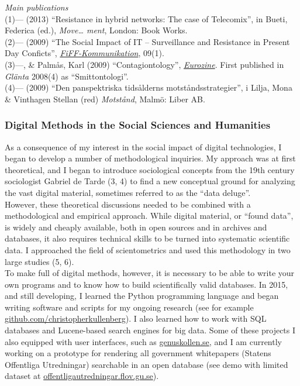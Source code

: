 \documentclass[a4paper,11pt,oneside]{article}
\begin{document}
      \noindent  \emph{Main publications} \\
      (1)--- (2013) ``Resistance in hybrid networks: The case of Telecomix'', in Bueti, Federica (ed.), \emph{Move… ment}, London: Book Works.\\
      (2)--- (2009) ``The Social Impact of IT – Surveillance and Resistance in Present Day Conficts'', \href{http://www.fiff.de/publikationen/fiff-kommunikation/fk-2009/fiff-ko-1-2009/fiko_1_2009_kullenberg.pdf}{\emph{FiFF-Kommunikation}}, 09(1).\\
      (3)---, \& Palmås, Karl (2009) ``Contagiontology'', \href{http://www.eurozine.com/articles/2009-03-09-kullenberg-en.html}{\emph{Eurozine}}. First published in \emph{Glänta} 2008(4) as ``Smittontologi''.\\
      (4)--- (2009) ``Den panspektriska tidsålderns motståndsstrategier'', i Lilja, Mona \& Vinthagen Stellan (red) \emph{Motstånd}, Malmö: Liber AB.\\


    \subsubsection{Digital Methods in the Social Sciences and Humanities}
    As a consequence of my interest in the social impact of digital technologies,
    I began to develop a number of methodological inquiries. My approach was
    at first theoretical, and I began to introduce sociological concepts from the
    19th century sociologist Gabriel de Tarde (3, 4) to find a new conceptual
    ground for analyzing the vast digital material, sometimes referred to as the
    ``data deluge''.\\

    However, these theoretical discussions needed to be combined with a methodological and
    empirical approach. While digital material, or ``found data'', is widely and cheaply
    available, both in open sources and in archives and databases, it also requires
    technical skills to be turned into systematic scientific data. I approached the
    field of scientometrics and used this methodology in two large studies (5, 6).\\

    To make full of digital methods, however, it is necessary to be able to write
    your own programs and to know how to build scientifically valid databases. In
    2015, and still developing, I learned the Python programming language and began
    writing software and scripts for my ongoing research (see for example
    \href{https://github.com/christopherkullenberg}{github.com/christopherkullenberg}).
    I also learned how to work with SQL databases and Lucene-based search engines for big data.
    Some of these projects I also equipped with user interfaces, such as
    \href{https://genuskollen.se/}{genuskollen.se}, and I am currently working
    on a prototype for rendering all government whitepapers (Statens Offentliga Utredningar)
    searchable in an open database (see demo with limited dataset at
     \href{http://offentligautredningar.flov.gu.se/}{offentligautredningar.flov.gu.se}).\\
\end{document}
